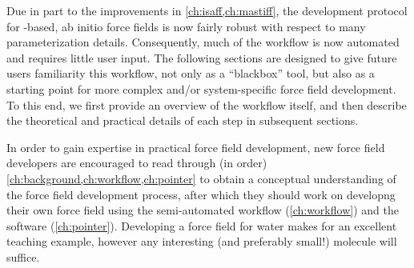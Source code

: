 Due in part to the improvements in \cref{ch:isaff,ch:mastiff}, the development
protocol for \sapt-based, ab initio force fields is now fairly robust with
respect to many parameterization details. Consequently, much of the workflow
is now automated and requires little user input. The following sections are
designed to give future users familiarity this workflow, not only as a
``blackbox'' tool, but also as a starting point for more complex and/or
system-specific force field development. To this end, we first provide an
overview of the workflow itself, and then describe the theoretical and
practical details of each step in subsequent sections.

In order to gain expertise in practical force field development, new force field developers are encouraged to read through (in order)
\cref{ch:background,ch:workflow,ch:pointer} to obtain a conceptual
understanding of the force field development process, after which they should
work on
developng their own force field using
the semi-automated workflow (\cref{ch:workflow}) and the \pointer software
(\cref{ch:pointer}). Developing a force field for water
makes for an excellent teaching example, however any interesting (and preferably
small!) molecule will suffice.

